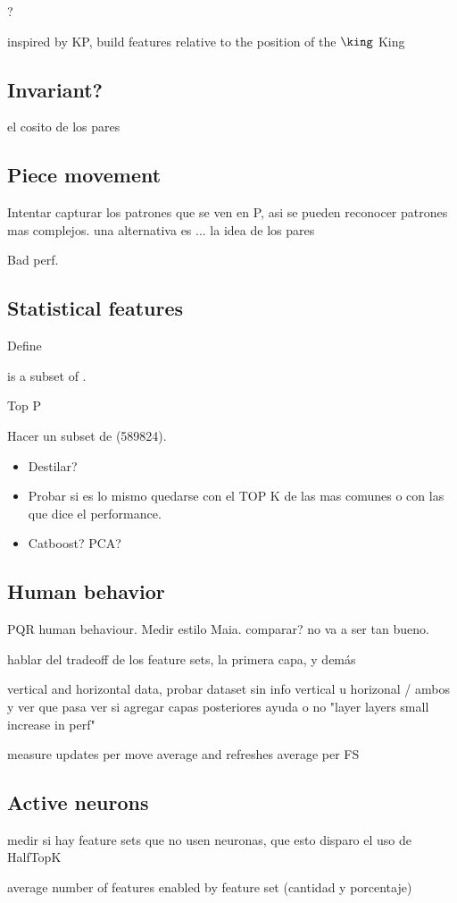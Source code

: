 ?

inspired by KP, build features relative to the position of the $\king$ King

\subsection{Invariant?}

el cosito de los pares

\subsection{Piece movement}

Intentar capturar los patrones que se ven en P, asi se pueden reconocer patrones mas complejos.
una alternativa es ... la idea de los pares


Bad perf.

\subsection{Statistical features}

Define 

 is a subset of .

Top P

Hacer un subset de  (589824).

\begin{itemize}
\item Destilar?
\item Probar si es lo mismo quedarse con el TOP K de las mas comunes o con las que dice el performance.
\item Catboost? PCA?
\end{itemize}

\subsection{Human behavior}

PQR human behaviour. Medir estilo Maia. comparar? no va a ser tan bueno.




hablar del tradeoff de los feature sets, la primera capa, y demás

vertical and horizontal data, probar dataset sin info vertical u horizonal / ambos y ver que pasa
ver si agregar capas posteriores ayuda o no "layer layers small increase in perf"

measure updates per move average and refreshes average per FS



\subsection{Active neurons}

medir si hay feature sets que no usen neuronas, que esto disparo el uso de HalfTopK

average number of features enabled by feature set (cantidad y porcentaje)




